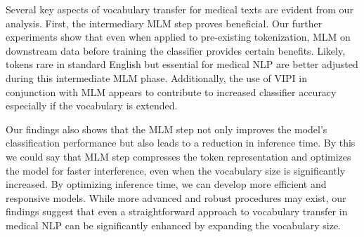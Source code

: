 \documentclass[11pt]{article}
\begin{document}
Several key aspects of vocabulary transfer for medical texts are evident from our analysis. First, the intermediary MLM step proves beneficial. Our further experiments show that even when applied to pre-existing tokenization, MLM on downstream data before training the classifier provides certain benefits. Likely, tokens rare in standard English but essential for medical NLP are better adjusted during this intermediate MLM phase. Additionally, the use of VIPI in conjunction with MLM appears to contribute to increased classifier accuracy especially if the vocabulary is extended.

Our findings also shows that the MLM step not only improves the model's classification performance but also leads to a reduction in inference time. By this we could say that MLM step compresses the token representation and optimizes the model for faster interference, even when the vocabulary size is significantly increased. By optimizing inference time, we can develop more efficient and responsive models. While more advanced and robust procedures may exist, our findings suggest that even a straightforward approach to vocabulary transfer in medical NLP can be significantly enhanced by expanding the vocabulary size.




\end{document}
